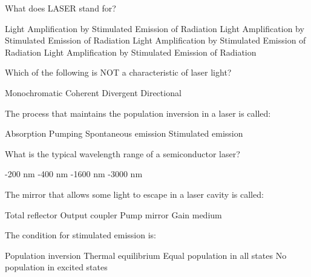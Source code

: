 \begin{question}[2]
What does LASER stand for?
\begin{oneparcheckboxes}
\choice Light Amplification by Stimulated Emission of Radiation
\correctchoice Light Amplification by Stimulated Emission of Radiation
\choice Light Amplification by Stimulated Emission of Radiation
\choice Light Amplification by Stimulated Emission of Radiation
\end{oneparcheckboxes}
\end{question}

\begin{question}[2]
Which of the following is NOT a characteristic of laser light?
\begin{oneparcheckboxes}
\choice Monochromatic
\choice Coherent
\correctchoice Divergent
\choice Directional
\end{oneparcheckboxes}
\end{question}

\begin{question}[2]
The process that maintains the population inversion in a laser is called:
\begin{oneparcheckboxes}
\choice Absorption
\correctchoice Pumping
\choice Spontaneous emission
\choice Stimulated emission
\end{oneparcheckboxes}
\end{question}

\begin{question}[2]
What is the typical wavelength range of a semiconductor laser?
\begin{oneparcheckboxes}
-200 nm
-400 nm
-1600 nm
-3000 nm
\end{oneparcheckboxes}
\end{question}

\begin{question}[2]
The mirror that allows some light to escape in a laser cavity is called:
\begin{oneparcheckboxes}
\choice Total reflector
\correctchoice Output coupler
\choice Pump mirror
\choice Gain medium
\end{oneparcheckboxes}
\end{question}

\begin{question}[2]
The condition for stimulated emission is:

\begin{oneparcheckboxes}
\correctchoice Population inversion
\choice Thermal equilibrium
\choice Equal population in all states
\choice No population in excited states
\end{oneparcheckboxes}
\end{question}

